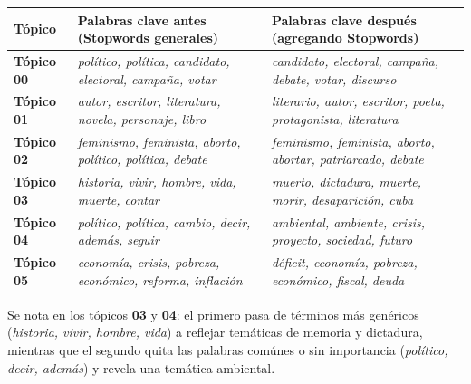 \documentclass[
]{article}
\newcounter{none} %
\begin{document}
{\def\LTcaptype{none} %
\begin{longtable}[]{@{}
  >{\raggedright\arraybackslash}m{}
  >{\raggedright\arraybackslash}m{}
  >{\raggedright\arraybackslash}m{}@{}}
\toprule\noalign{}
\begin{minipage}[b]{\linewidth}\raggedright
Tópico
\end{minipage} & \begin{minipage}[b]{\linewidth}\raggedright
Palabras clave antes (Stopwords generales)
\end{minipage} & \begin{minipage}[b]{\linewidth}\raggedright
Palabras clave después (agregando Stopwords)
\end{minipage}\\ \midrule
\midrule\noalign{}
\endhead
\bottomrule\noalign{}
\endlastfoot
\textbf{Tópico 00} & \emph{político, política, candidato, electoral,
campaña, votar} & \emph{candidato, electoral, campaña, debate, votar,
discurso}\\ \midrule
\textbf{Tópico 01} & \emph{autor, escritor, literatura, novela,
personaje, libro} & \emph{literario, autor, escritor, poeta,
protagonista, literatura}\\ \midrule
\textbf{Tópico 02} & \emph{feminismo, feminista, aborto, político,
política, debate} & \emph{feminismo, feminista, aborto, abortar,
patriarcado, debate}\\ \midrule
\textbf{Tópico 03} & \emph{historia, vivir, hombre, vida, muerte,
contar} & \emph{muerto, dictadura, muerte, morir, desaparición, cuba}\\ \midrule
\textbf{Tópico 04} & \emph{político, política, cambio, decir, además,
seguir} & \emph{ambiental, ambiente, crisis, proyecto, sociedad,
futuro}\\ \midrule
\textbf{Tópico 05} & \emph{economía, crisis, pobreza, económico,
reforma, inflación} & \emph{déficit, economía, pobreza, económico,
fiscal, deuda}\\ \midrule
\end{longtable}
}

Se nota en los tópicos \textbf{03} y \textbf{04}: el primero pasa de
términos más genéricos (\emph{historia, vivir, hombre, vida}) a reflejar
temáticas de memoria y dictadura, mientras que el segundo quita las
palabras comúnes o sin importancia (\emph{político, decir, además}) y
revela una temática ambiental.
\end{document}

